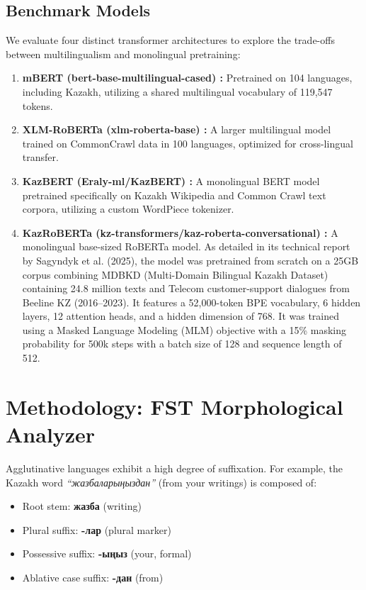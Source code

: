 \documentclass[runningheads]{llncs}
\begin{document}
\subsection{Benchmark Models}
We evaluate four distinct transformer architectures to explore the trade-offs between multilingualism and monolingual pretraining:
\begin{enumerate}
\item \textbf{mBERT (bert-base-multilingual-cased) \cite{2}:} Pretrained on 104 languages, including Kazakh, utilizing a shared multilingual vocabulary of 119,547 tokens.
\item \textbf{XLM-RoBERTa (xlm-roberta-base) \cite{3}:} A larger multilingual model trained on CommonCrawl data in 100 languages, optimized for cross-lingual transfer.
\item \textbf{KazBERT (Eraly-ml/KazBERT) \cite{4}:} A monolingual BERT model pretrained specifically on Kazakh Wikipedia and Common Crawl text corpora, utilizing a custom WordPiece tokenizer.
\item \textbf{KazRoBERTa (kz-transformers/kaz-roberta-conversational) \cite{5}:} A monolingual base-sized RoBERTa model. As detailed in its technical report by Sagyndyk et al. (2025), the model was pretrained from scratch on a 25GB corpus combining MDBKD (Multi-Domain Bilingual Kazakh Dataset) containing 24.8 million texts and Telecom customer-support dialogues from Beeline KZ (2016–2023). It features a 52,000-token BPE vocabulary, 6 hidden layers, 12 attention heads, and a hidden dimension of 768. It was trained using a Masked Language Modeling (MLM) objective with a 15\% masking probability for 500k steps with a batch size of 128 and sequence length of 512.
\end{enumerate}

\section{Methodology: FST Morphological Analyzer}
Agglutinative languages exhibit a high degree of suffixation. For example, the Kazakh word \textit{``жазбаларыңыздан''} (from your writings) is composed of:
\begin{itemize}
\item Root stem: \textbf{жазба} (writing)
\item Plural suffix: \textbf{-лар} (plural marker)
\item Possessive suffix: \textbf{-ыңыз} (your, formal)
\item Ablative case suffix: \textbf{-дан} (from)
\end{itemize}
\end{document}

